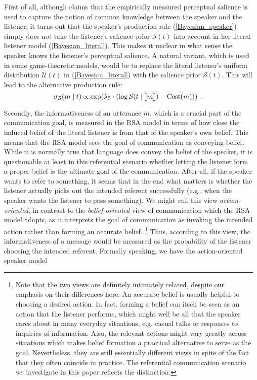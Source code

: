 First of all, although \cite{Frank} claims that the empirically measured perceptual salience is used to capture the notion of common knowledge between the speaker and the listener, it turns out that the speaker's production rule (\ref{Bayesian_speaker}) simply does not take the listener's salience prior $\mathcal{S}(t)$ into account in her literal listener model (\ref{Bayesian_literal}). This makes it unclear in what sense the speaker knows the listener's perceptual salience. A natural variant, which is used in some game-theoretic models, would be to replace the literal listener's uniform distribution $\mathcal{U}(t)$ in (\ref{Bayesian_literal}) with the salience prior $\mathcal{S}(t)$. This will lead to the alternative production rule:
\begin{equation} \label{Bayesian_speaker_salience}
\sigma_\mathcal{S}(m \mid t) \propto \exp(\lambda_\mathrm{S} \cdot (\log \mathcal{S}(t\mid \llbracket m \rrbracket)-\mbox{Cost}(m))) \enspace .
\end{equation}


Secondly, the informativeness of an utterance $m$, which is a crucial part of the communication goal, is measured in the RSA model in terms of how close the induced belief of the literal listener is from that of the speaker's own belief. This means that the RSA model sees the goal of communication as conveying belief. While it is normally true that language does convey the belief of the speaker, it is questionable at least in this referential scenario whether letting the listener form a proper belief is the ultimate goal of the communication. After all, if the speaker wants to refer to something, it seems that in the end what matters is whether the listener actually picks out the intended referent successfully (e.g., when the speaker wants the listener to pass something). We might call this view \emph{action-oriented}, in contrast to the \emph{belief-oriented} view of communication which the RSA model adopts, as it interprets the goal of communication as invoking the intended action rather than forming an accurate belief. \footnote{Note that the two views are definitely intimately related, despite our emphasis on their differences here. An accurate belief is usually helpful to choosing a desired action. In fact, forming a belief can itself be seen as an action that the listener performs, which might well be all that the speaker cares about in many everyday situations, e.g. casual talks or responses to inquiries of information. Also, the relevant actions might vary greatly across situations which makes belief formation a practical alternative to serve as the goal. Nevertheless, they are still essentially different views in spite of the fact that they often coincide in practice. The referential communication scenario we investigate in this paper reflects the distinction.} Thus, according to this view, the informativeness of a message would be measured as the probability of the listener choosing the intended referent. Formally speaking, we have the action-oriented speaker model
  
